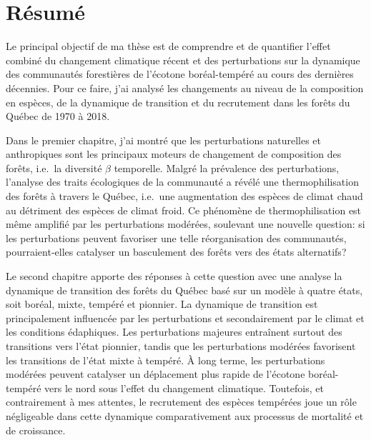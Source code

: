 \francais

\chapter*{Résumé}

Le principal objectif de ma thèse est de comprendre et de quantifier
l'effet combiné du changement climatique récent et des perturbations sur
la dynamique des communautés forestières de l'écotone boréal-tempéré au
cours des dernières décennies. Pour ce faire, j'ai analysé les
changements au niveau de la composition en espèces, de la dynamique de
transition et du recrutement dans les forêts du Québec de 1970 à 2018.

Dans le premier chapitre, j'ai montré que les perturbations naturelles
et anthropiques sont les principaux moteurs de changement de composition
des forêts, i.e.~la diversité \(\beta\) temporelle. Malgré la prévalence
des perturbations, l'analyse des traits écologiques de la communauté a
révélé une thermophilisation des forêts à travers le Québec, i.e.~une
augmentation des espèces de climat chaud au détriment des espèces de
climat froid. Ce phénomène de thermophilisation est même amplifié par
les perturbations modérées, soulevant une nouvelle question: si les
perturbations peuvent favoriser une telle réorganisation des
communautés, pourraient-elles catalyser un basculement des forêts vers
des états alternatifs?

Le second chapitre apporte des réponses à cette question avec une
analyse la dynamique de transition des forêts du Québec basé sur un
modèle à quatre états, soit boréal, mixte, tempéré et pionnier. La
dynamique de transition est principalement influencée par les
perturbations et secondairement par le climat et les conditions
édaphiques. Les perturbations majeures entraînent surtout des
transitions vers l'état pionnier, tandis que les perturbations modérées
favorisent les transitions de l'état mixte à tempéré. À long terme, les
perturbations modérées peuvent catalyser un déplacement plus rapide de
l'écotone boréal-tempéré vers le nord sous l'effet du changement
climatique. Toutefois, et contrairement à mes attentes, le recrutement
des espèces tempérées joue un rôle négligeable dans cette dynamique
comparativement aux processus de mortalité et de croissance.

